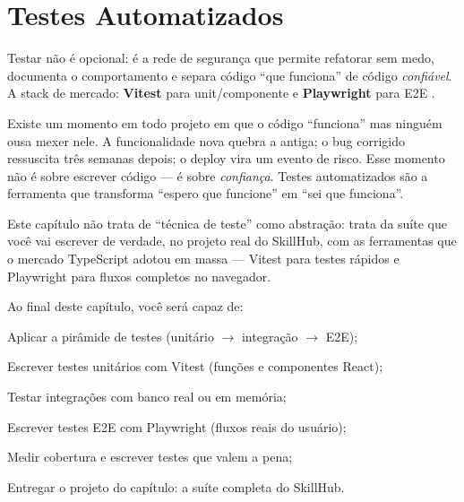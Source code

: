 \chapter{Testes Automatizados}
\label{cap:testes}

\begin{caixaconceito}
Testar não é opcional: é a rede de segurança que permite refatorar sem medo,
documenta o comportamento e separa código ``que funciona'' de código
\emph{confiável}. A stack de mercado: \textbf{Vitest} para unit/componente e
\textbf{Playwright} para E2E \cite{vitest-docs,playwright-docs}.
\end{caixaconceito}

Existe um momento em todo projeto em que o código ``funciona'' mas ninguém
ousa mexer nele. A funcionalidade nova quebra a antiga; o bug corrigido
ressuscita três semanas depois; o deploy vira um evento de risco. Esse momento
não é sobre escrever código — é sobre \emph{confiança}. Testes automatizados
são a ferramenta que transforma ``espero que funcione'' em ``sei que
funciona''.

Este capítulo não trata de ``técnica de teste'' como abstração: trata da
suíte que você vai escrever de verdade, no projeto real do SkillHub, com as
ferramentas que o mercado TypeScript adotou em massa — Vitest para testes
rápidos e Playwright para fluxos completos no navegador.

Ao final deste capítulo, você será capaz de:
\begin{objetivos}
  \item Aplicar a pirâmide de testes (unitário $\rightarrow$ integração $\rightarrow$ E2E);
  \item Escrever testes unitários com Vitest (funções e componentes React);
  \item Testar integrações com banco real ou em memória;
  \item Escrever testes E2E com Playwright (fluxos reais do usuário);
  \item Medir cobertura e escrever testes que valem a pena;
  \item Entregar o projeto do capítulo: a suíte completa do SkillHub.
\end{objetivos}

